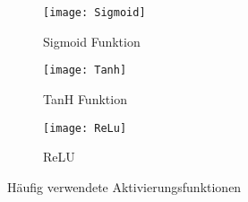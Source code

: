 \begin{figure}[h]
    \centering
    \begin{subfigure}[t]{0.3\textwidth}
		\texttt{[image: Sigmoid]}
		\caption{Sigmoid Funktion}
    \end{subfigure}
    \begin{subfigure}[t]{0.3\textwidth}
		\texttt{[image: Tanh]}
		\caption{TanH Funktion}
    \end{subfigure}
    \begin{subfigure}[t]{0.3\textwidth}
        \texttt{[image: ReLu]}
        \caption{ReLU}
    \end{subfigure}
    \caption{Häufig verwendete Aktivierungsfunktionen}
    \label{eval:function}
\end{figure}